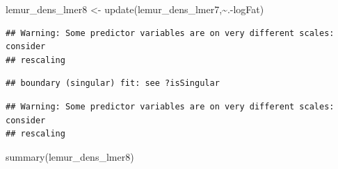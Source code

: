 \documentclass[
  12pt,
]{article}
\newenvironment{Shaded}{\begin{snugshade}}{\end{snugshade}}
\newcommand{\FunctionTok}[1]{\textcolor[rgb]{0.00,0.00,0.00}{#1}}
\newcommand{\NormalTok}[1]{#1}
\newcommand{\OtherTok}[1]{\textcolor[rgb]{0.56,0.35,0.01}{#1}}
\newcommand{\SpecialCharTok}[1]{\textcolor[rgb]{0.00,0.00,0.00}{#1}}
\begin{document}
\begin{Shaded}
\begin{Highlighting}[]
\NormalTok{lemur\_dens\_lmer8 }\OtherTok{\textless{}{-}} \FunctionTok{update}\NormalTok{(lemur\_dens\_lmer7,}\SpecialCharTok{\textasciitilde{}}\NormalTok{.}\SpecialCharTok{{-}}\NormalTok{logFat)}
\end{Highlighting}
\end{Shaded}

\begin{verbatim}
## Warning: Some predictor variables are on very different scales: consider
## rescaling
\end{verbatim}

\begin{verbatim}
## boundary (singular) fit: see ?isSingular
\end{verbatim}

\begin{verbatim}
## Warning: Some predictor variables are on very different scales: consider
## rescaling
\end{verbatim}

\begin{Shaded}
\begin{Highlighting}[]
\FunctionTok{summary}\NormalTok{(lemur\_dens\_lmer8)}
\end{Highlighting}
\end{Shaded}
\end{document}
